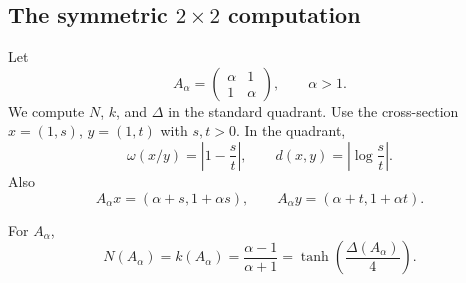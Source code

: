 \subsection{The symmetric $2\times2$ computation}
Let
\[
  A_\alpha=\begin{pmatrix}\alpha&1\\1&\alpha\end{pmatrix},
  \qquad \alpha>1.
\]
We compute $N$, $k$, and $\Delta$ in the standard quadrant.
Use the cross-section $x=(1,s)$, $y=(1,t)$ with $s,t>0$.
In the quadrant,
\[
  \omega(x/y)=\left|1-\frac{s}{t}\right|,
  \qquad
  d(x,y)=\left|\log\frac{s}{t}\right|.
\]
Also
\[
  A_\alpha x=(\alpha+s,1+\alpha s),
  \qquad
  A_\alpha y=(\alpha+t,1+\alpha t).
\]

\begin{theorem}
For $A_\alpha$,
\[
  N(A_\alpha)=k(A_\alpha)=\frac{\alpha-1}{\alpha+1}
  =\tanh\!\left(\frac{\Delta(A_\alpha)}{4}\right).
\]
\end{theorem}

